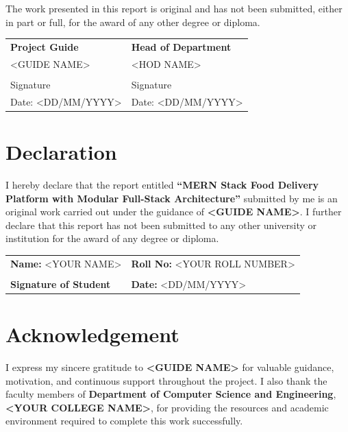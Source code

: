 \documentclass[12pt,a4paper]{report}
\newcommand{\ReportTitle}{MERN Stack Food Delivery Platform with Modular Full-Stack Architecture}
\newcommand{\StudentName}{<YOUR NAME>}
\newcommand{\RollNo}{<YOUR ROLL NUMBER>}
\newcommand{\DepartmentName}{Department of Computer Science and Engineering}
\newcommand{\CollegeName}{<YOUR COLLEGE NAME>}
\newcommand{\GuideName}{<GUIDE NAME>}
\begin{document}
\vspace{0.5cm}
The work presented in this report is original and has not been submitted, either in part or full, for the award of any other degree or diploma.

\vspace{1.8cm}
\noindent
\begin{tabular}{p{} p{}}
\textbf{Project Guide} & \textbf{Head of Department} \\
\GuideName & <HOD NAME> \\
\vspace{1.2cm} & \\
Signature & Signature \\
Date: <DD/MM/YYYY> & Date: <DD/MM/YYYY> \\
\end{tabular}

\chapter*{Declaration}

I hereby declare that the report entitled \textbf{``\ReportTitle''} submitted by me is an original work carried out under the guidance of \textbf{\GuideName}. I further declare that this report has not been submitted to any other university or institution for the award of any degree or diploma.

\vspace{1.5cm}
\noindent
\begin{tabular}{p{} p{}}
\textbf{Name:} \StudentName & \textbf{Roll No:} \RollNo \\
\vspace{0.8cm} & \\
\textbf{Signature of Student} & \textbf{Date:} <DD/MM/YYYY> \\
\end{tabular}

\chapter*{Acknowledgement}

I express my sincere gratitude to \textbf{\GuideName} for valuable guidance, motivation, and continuous support throughout the project. I also thank the faculty members of \textbf{\DepartmentName}, \textbf{\CollegeName}, for providing the resources and academic environment required to complete this work successfully.
\end{document}
